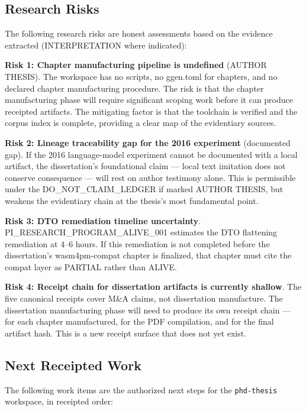 \subsection{Research Risks}
\label{sec:phd-thesis-open-risks}

The following research risks are honest assessments based on the evidence extracted
(INTERPRETATION where indicated):

\textbf{Risk 1: Chapter manufacturing pipeline is undefined} (AUTHOR THESIS).
The workspace has no scripts, no ggen.toml for chapters, and no declared chapter
manufacturing procedure. The risk is that the chapter manufacturing phase will require
significant scoping work before it can produce receipted artifacts. The mitigating factor is
that the toolchain is verified and the corpus index is complete, providing a clear map of
the evidentiary sources.

\textbf{Risk 2: Lineage traceability gap for the 2016 experiment} (documented gap).
If the 2016 language-model experiment cannot be documented with a local artifact, the
dissertation's foundational claim --- local text imitation does not conserve consequence ---
will rest on author testimony alone. This is permissible under the DO\_NOT\_CLAIM\_LEDGER
if marked AUTHOR THESIS, but weakens the evidentiary chain at the thesis's most fundamental
point.

\textbf{Risk 3: DTO remediation timeline uncertainty}.
PI\_RESEARCH\_PROGRAM\_ALIVE\_001 estimates the DTO flattening remediation at 4--6 hours.
If this remediation is not completed before the dissertation's wasm4pm-compat chapter is
finalized, that chapter must cite the compat layer as PARTIAL rather than ALIVE.

\textbf{Risk 4: Receipt chain for dissertation artifacts is currently shallow}.
The five canonical receipts cover M\&A claims, not dissertation manufacture. The dissertation
manufacturing phase will need to produce its own receipt chain --- for each chapter
manufactured, for the PDF compilation, and for the final artifact hash. This is a new receipt
surface that does not yet exist.

\subsection{Next Receipted Work}
\label{sec:phd-thesis-open-next}

The following work items are the authorized next steps for the \texttt{phd-thesis} workspace,
in receipted order:

